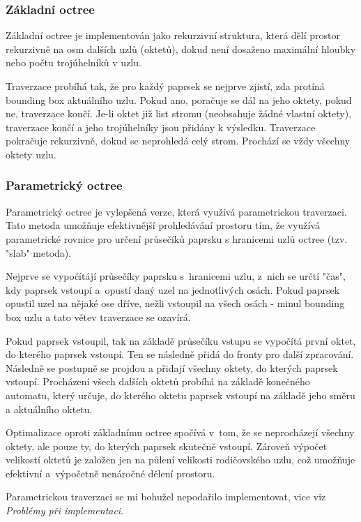 \documentclass[10pt,a4paper,twocolumn]{article}
\begin{document}
\subsubsection{Základní octree}

Základní octree je implementován jako rekurzivní struktura, která dělí prostor rekurzivně na osm dalších uzlů (oktetů), dokud není dosaženo maximální hloubky nebo počtu trojúhelníků v uzlu.

Traverzace probíhá tak, že pro každý paprsek se nejprve zjistí, zda protíná bounding box aktuálního uzlu. Pokud ano, poračuje se dál na jeho oktety, pokud ne, traverzace končí. Je-li oktet již list stromu (neobsahuje žádné vlastní oktety), traverzace končí a jeho trojúhelníky jsou přidány k výsledku. Traverzace pokračuje rekurzivně, dokud se neprohledá celý strom. Prochází se vždy všechny oktety uzlu.

\subsubsection{Parametrický octree}

Parametrický octree je vylepšená verze, která využívá parametrickou traverzaci. Tato metoda umožňuje efektivnější prohledávání prostoru tím, že využívá parametrické rovnice pro určení průsečíků paprsku s hranicemi uzlů octree (tzv. "slab" metoda).

Nejprve se vypočítájí průsečíky paprsku s~hranicemi uzlu, z~nich se určtí "čas", kdy paprsek vstoupí a~opustí daný uzel na jednotlivých osách. Pokud paprsek opustil uzel na nějaké ose dříve, nežli vstoupil na všech osách - minul bounding box uzlu a tato větev traverzace se ozavírá.

Pokud paprsek vstoupil, tak na základě průsečíku vstupu se vypočítá první oktet, do kterého paprsek vstoupí. Ten se následně přidá do fronty pro další zpracování. Následně se postupně se projdou a přidají všechny oktety, do kterých paprsek vstoupí. Procházení všech dalších oktetů probíhá na základě konečného automatu, který určuje, do kterého oktetu paprsek vstoupí na základě jeho směru a aktuálního oktetu.

Optimalizace oproti základnímu octree spočívá v~tom, že se neprocházejí všechny oktety, ale pouze ty, do kterých paprsek skutečně vstoupí. Zároveň výpočet velikostí oktetů je založen jen na půlení velikosti rodičovského uzlu, což umožňuje efektivní a~výpočetně nenáročné dělení prostoru.

Parametrickou traverzaci se mi bohužel nepodařilo implementovat, vice viz \textit{Problémy při implementaci}.
\end{document}
